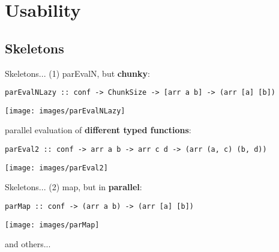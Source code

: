 \section{Usability}
\subsection{Skeletons}
\begin{frame}[fragile]{Skeletons... (1)}
parEvalN, but \textbf{chunky}:
\begin{lstlisting}[frame=htrbl]
parEvalNLazy :: conf -> ChunkSize -> [arr a b] -> (arr [a] [b])
\end{lstlisting}
\begin{center}
\texttt{[image: images/parEvalNLazy]}
\end{center}
parallel evaluation of \textbf{different typed functions}:
\begin{lstlisting}[frame=htrbl]
parEval2 :: conf -> arr a b -> arr c d -> (arr (a, c) (b, d))
\end{lstlisting}
\begin{center}
\texttt{[image: images/parEval2]}
\end{center}
\end{frame}
\begin{frame}[fragile]{Skeletons... (2)}
map, but in \textbf{parallel}:
\begin{lstlisting}[frame=htrbl]
parMap :: conf -> (arr a b) -> (arr [a] [b])
\end{lstlisting}
\begin{center}
\texttt{[image: images/parMap]}
\end{center}
\begin{center}
	and others...
\end{center}
\end{frame}
